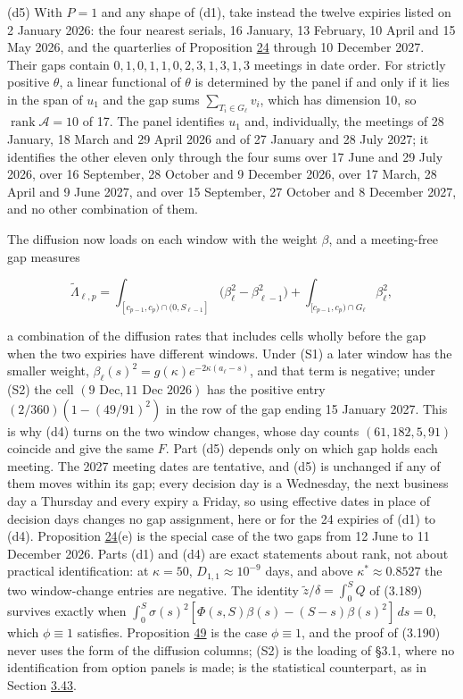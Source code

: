 \documentclass[11pt]{article}
\begin{document}
(d5) With \(P=1\) and any shape of (d1), take instead the twelve expiries listed on 2 January 2026: the four nearest serials, 16 January, 13 February, 10 April and 15 May 2026, and the quarterlies of Proposition \hyperref[res:Proposition-24]{24} through 10 December 2027. Their gaps contain \(0,1,0,1,1,0,2,3,1,3,1,3\) meetings in date order. For strictly positive \(\theta\), a linear functional of \(\theta\) is determined by the panel if and only if it lies in the span of \(u_1\) and the gap sums \(\sum_{T_i\in G_\ell}v_i\), which has dimension 10, so \(\operatorname{rank}\mathcal A=10\) of 17. The panel identifies \(u_1\) and, individually, the meetings of 28 January, 18 March and 29 April 2026 and of 27 January and 28 July 2027; it identifies the other eleven only through the four sums over 17 June and 29 July 2026, over 16 September, 28 October and 9 December 2026, over 17 March, 28 April and 9 June 2027, and over 15 September, 27 October and 8 December 2027, and no other combination of them.

The diffusion now loads on each window with the weight \(\beta\), and a meeting-free gap measures

\begin{equation*}
\tilde\Lambda_{\ell,p}=\int_{[c_{p-1},c_p)\cap(0,S_{\ell-1}]}\bigl(\beta_\ell^2-\beta_{\ell-1}^2\bigr)+\int_{[c_{p-1},c_p)\cap G_\ell}\beta_\ell^2, \tag{3.198}\label{eq:3.198}
\end{equation*}

a combination of the diffusion rates that includes cells wholly before the gap when the two expiries have different windows. Under (S1) a later window has the smaller weight, \(\beta_\ell(s)^2=g(\kappa)e^{-2\kappa(a_\ell-s)}\), and that term is negative; under (S2) the cell \((9\text{ Dec},11\text{ Dec }2026)\) has the positive entry \((2/360)(1-(49/91)^2)\) in the row of the gap ending 15 January 2027. This is why (d4) turns on the two window changes, whose day counts \((61,182,5,91)\) coincide and give the same \(F\). Part (d5) depends only on which gap holds each meeting. The 2027 meeting dates are tentative, and (d5) is unchanged if any of them moves within its gap; every decision day is a Wednesday, the next business day a Thursday and every expiry a Friday, so using effective dates in place of decision days changes no gap assignment, here or for the 24 expiries of (d1) to (d4). Proposition \hyperref[res:Proposition-24]{24}(e) is the special case of the two gaps from 12 June to 11 December 2026. Parts (d1) and (d4) are exact statements about rank, not about practical identification: at \(\kappa=50\), \(D_{1,1}\approx10^{-9}\) days, and above \(\kappa^*\approx0.8527\) the two window-change entries are negative. The identity \(\tilde z/\delta=\int_0^SQ\) of (3.189) survives exactly when \(\int_0^S\sigma(s)^2[\Phi(s,S)\beta(s)-(S-s)\beta(s)^2]\,ds=0\), which \(\phi\equiv1\) satisfies. Proposition \hyperref[res:Proposition-49]{49} is the case \(\phi\equiv1\), and the proof of (3.190) never uses the form of the diffusion columns; (S2) is the loading of \cite{brace2024sofr} §3.1, where no identification from option panels is made; \cite{wright2020event} is the statistical counterpart, as in Section \hyperref[sec:3.43]{3.43}.
\end{document}
